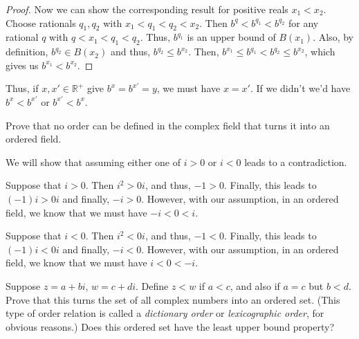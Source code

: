 \documentclass[12 pt, letterpaper]{hmcpset}
\begin{document}
\begin{solution}
\begin{enumerate}
\begin{proof}
				Now we can show the corresponding result for positive reals $x_{1} < x_{2}$. Choose rationals $q_{1}, q_{2}$ with $x_{1} < q_{1} < q_{2} < x_{2}$. Then $b^{q} < b^{q_{1}} < b^{q_{2}}$ for any rational $q$ with $q < x_{1} < q_{1} < q_{2}$. Thus, $b^{q_{1}}$ is an upper bound of $B(x_{1})$. Also, by definition, $b^{q_{2}} \in B(x_{2})$ and thus, $b^{q_{2}} \le b^{x_{2}}$. Then, $b^{x_{1}} \le b^{q_{1}} < b^{q_{2}} \le b^{x_{2}}$, which gives us $b^{x_{1}} < b^{x_{2}}$.
			\end{proof}
			Thus, if $x, x' \in \mathbb{R}^{+}$ give $b^{x} = b^{x'} = y$, we must have $x = x'$. If we didn't we'd have $b^{x} < b^{x'}$ or $b^{x'} < b^{x}$.
	\end{enumerate}
\end{solution}

\pagebreak

\begin{problem}[8.]
	Prove that no order can be defined in the complex field that turns it into an ordered field.
\end{problem}

\begin{solution}
	We will show that assuming either one of $i > 0$ or $i < 0$ leads to a contradiction. 

	Suppose that $i > 0$. Then $i^{2} > 0i$, and thus, $-1 > 0$. Finally, this leads to $(-1)i > 0i$ and finally, $-i > 0$. However, with our assumption, in an ordered field, we know that we must have $-i < 0 < i$. 
	
	Suppose that $i < 0$. Then $i^{2} < 0i$, and thus, $-1 < 0$. Finally, this leads to $(-1) i < 0i$ and finally, $-i < 0$. However, with our assumption, in an ordered field, we know that we must have $i < 0 < -i$.
\end{solution}

\pagebreak

\begin{problem}[9.]
	Suppose $z = a + bi$, $w = c + di$. Define $z < w$ if $a < c$, and also if $a = c$ but $b < d$. Prove that this turns the set of all complex numbers into an ordered set. (This type of order relation is called a \textit{dictionary order} or \textit{lexicographic order}, for obvious reasons.) Does this ordered set have the least upper bound property?
\end{problem}
\end{document}
